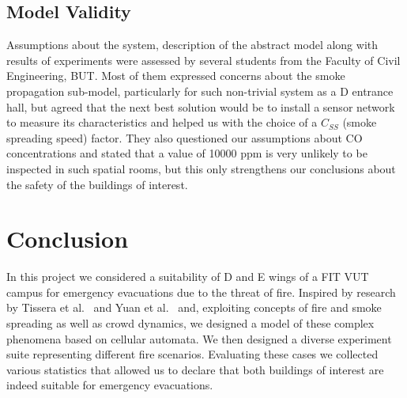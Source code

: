 \subsection{Model Validity}
Assumptions about the system, description of the abstract model along with
results of experiments were assessed by several students from the Faculty of
Civil Engineering, BUT.
Most of them expressed concerns about the smoke propagation sub-model,
particularly for such non-trivial system as a D entrance hall, but agreed
that the next best solution would be to install a sensor network to measure
its characteristics and helped us with the choice of a $C_{SS}$
(smoke spreading speed) factor.
They also questioned our assumptions about CO concentrations and stated that
a value of 10000 ppm is very unlikely to be inspected in such spatial rooms,
but this only strengthens our conclusions about the safety of the buildings
of interest.

\section{Conclusion}
In this project we considered a suitability of D and E wings of a FIT VUT campus
for emergency evacuations due to the threat of fire.
Inspired by research by Tissera et al.~\cite{Tissera1, Tissera2} and
Yuan et al.~\cite{Yuan} and, exploiting concepts of fire and smoke spreading as
well as crowd dynamics, we designed a model of these complex phenomena based on
cellular automata.
We then designed a diverse experiment suite representing different fire
scenarios.
Evaluating these cases we collected various statistics that allowed us to
declare that both buildings of interest are indeed suitable for emergency
evacuations.
